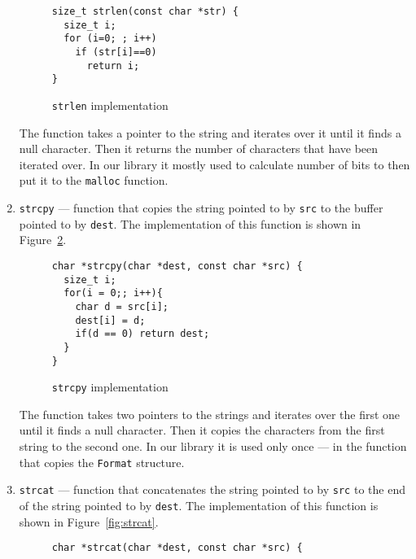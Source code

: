 \documentclass[14pt]{constructor-diploma}
\begin{document}
\begin{enumerate}
\begin{figure}[H]
      \begin{mdframed}[backgroundcolor=bg]
      \begin{verbatim}
size_t strlen(const char *str) {
  size_t i;
  for (i=0; ; i++)
    if (str[i]==0) 
      return i;
}
      \end{verbatim}
      \end{mdframed}
      \caption{\texttt{strlen} implementation}
      \label{fig:strlen}
      \end{figure}
    The function takes a pointer to the string and iterates over it until it finds a null character. 
    Then it returns the number of characters that have been iterated over. In our library it mostly used to
    calculate number of bits to then put it to the \texttt{malloc} function.
  \item \texttt{strcpy} --- function that copies the string pointed to by \texttt{src} to the buffer pointed to by \texttt{dest}. 
    The implementation of this function is shown in Figure~\ref{fig:strcpy}.
      \begin{figure}[H]
      \begin{mdframed}[backgroundcolor=bg]
      \begin{verbatim}
char *strcpy(char *dest, const char *src) {
  size_t i;
  for(i = 0;; i++){
    char d = src[i];
    dest[i] = d;
    if(d == 0) return dest;
  }
}
      \end{verbatim}
      \end{mdframed}
      \caption{\texttt{strcpy} implementation}
      \label{fig:strcpy}
      \end{figure}
    The function takes two pointers to the strings and iterates over the first one until it finds a null character. 
    Then it copies the characters from the first string to the second one. 
    In our library it is used only once --- in the function that copies the \texttt{Format} structure.
  \item \texttt{strcat} --- function that concatenates the string pointed to by \texttt{src} to the end of the string pointed to by \texttt{dest}.
    The implementation of this function is shown in Figure~\ref{fig:strcat}.
      \begin{figure}[H]
      \begin{mdframed}[backgroundcolor=bg]
      \begin{verbatim}
char *strcat(char *dest, const char *src) {

\end{verbatim}
\end{mdframed}
\end{figure}
\end{enumerate}
\end{document}
